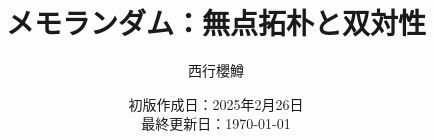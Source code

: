 \newcommand{\CATEGORY}{メモランダム}%
\newcommand{\TITLE}{無点拓朴と双対性}
\newcommand{\AUTHORNAME}{西行櫻鱒}
\newcommand{\CREATEDAT}{2025年2月26日}

\title{\CATEGORY：\TITLE}
\author{\AUTHORNAME}
\date{初版作成日：\CREATEDAT\\最終更新日：\today\\}

